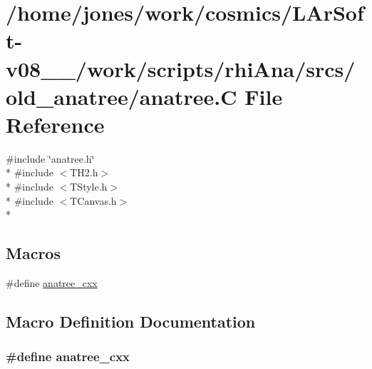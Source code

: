 \hypertarget{anatree_8C}{\section{/home/jones/work/cosmics/\-L\-Ar\-Soft-\/v08\-\_\-\_/work/scripts/rhi\-Ana/srcs/old\-\_\-anatree/anatree.C File Reference}
\label{anatree_8C}
}
{\ttfamily \#include \char`\"{}anatree.\-h\char`\"{}}\\*
{\ttfamily \#include $<$T\-H2.\-h$>$}\\*
{\ttfamily \#include $<$T\-Style.\-h$>$}\\*
{\ttfamily \#include $<$T\-Canvas.\-h$>$}\\*
\subsection*{Macros}
\begin{DoxyCompactItemize}
\item 
\#define \hyperlink{anatree_8C_a87bcc6658704419d6bf92d8cd31edacc}{anatree\-\_\-cxx}
\end{DoxyCompactItemize}


\subsection{Macro Definition Documentation}
\hypertarget{anatree_8C_a87bcc6658704419d6bf92d8cd31edacc}{
\subsubsection[{anatree\-\_\-cxx}]{\setlength{\rightskip}{0pt plus 5cm}\#define anatree\-\_\-cxx}}\label{anatree_8C_a87bcc6658704419d6bf92d8cd31edacc}

